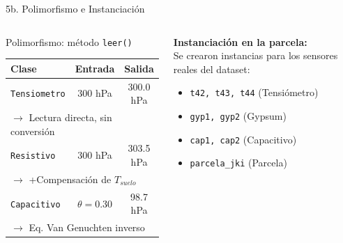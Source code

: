 \documentclass[11pt, aspectratio=169]{beamer}
\begin{document}
\begin{frame}{5b. Polimorfismo e Instanciación}
\begin{columns}[c]
\begin{block}{Polimorfismo: método \texttt{leer()}}
\centering
\begin{tabular}{@{}lcc@{}}
\toprule
\textbf{Clase} & \textbf{Entrada} & \textbf{Salida} \\
\midrule
\texttt{Tensiometro} & 300 hPa & 300.0 hPa \\
\multicolumn{3}{l}{\small $\rightarrow$ Lectura directa, sin conversión} \\[4pt]
\texttt{Resistivo} & 300 hPa & 303.5 hPa \\
\multicolumn{3}{l}{\small $\rightarrow$ +Compensación de $T_{suelo}$} \\[4pt]
\texttt{Capacitivo} & $\theta=0.30$ & 98.7 hPa \\
\multicolumn{3}{l}{\small $\rightarrow$ Eq. Van Genuchten inverso} \\
\bottomrule
\end{tabular}
\end{block}

\begin{tcolorbox}[colback=SmartLightBlue!8,colframe=SmartLightBlue!50,
    arc=4pt,left=6pt,right=6pt,top=4pt,bottom=4pt]
\textbf{Instanciación en la parcela:}\\
\vspace{0.2cm}
Se crearon instancias para los sensores reales del dataset:
\begin{itemize}
    \item \texttt{t42, t43, t44} (Tensiómetro)
    \item \texttt{gyp1, gyp2} (Gypsum)
    \item \texttt{cap1, cap2} (Capacitivo)
    \item \texttt{parcela\_jki} (Parcela)
\end{itemize}
\end{tcolorbox}
\end{columns}
\end{frame}
\end{document}
